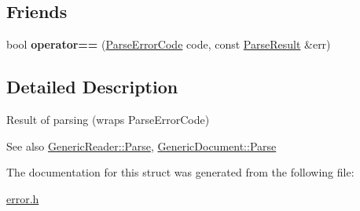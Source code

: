 \subsection*{Friends}
\begin{DoxyCompactItemize}
\item 
bool {\bfseries operator==} (\hyperlink{a00832_ga8d4b32dfc45840bca189ade2bbcb6ba7}{Parse\+Error\+Code} code, const \hyperlink{a00230}{Parse\+Result} \&err)\hypertarget{a00230_a58c9982e833d1c74686506ac7449200c}{}\label{a00230_a58c9982e833d1c74686506ac7449200c}

\end{DoxyCompactItemize}


\subsection{Detailed Description}
Result of parsing (wraps Parse\+Error\+Code) 


 \begin{DoxySeeAlso}{See also}
\hyperlink{a00122_a0c450620d14ff1824e58bb7bd9b42099}{Generic\+Reader\+::\+Parse}, \hyperlink{a00115_aadee36db7064cc9894a75c848831cdae}{Generic\+Document\+::\+Parse} 
\end{DoxySeeAlso}


The documentation for this struct was generated from the following file\+:\begin{DoxyCompactItemize}
\item 
\hyperlink{a00517}{error.\+h}\end{DoxyCompactItemize}
